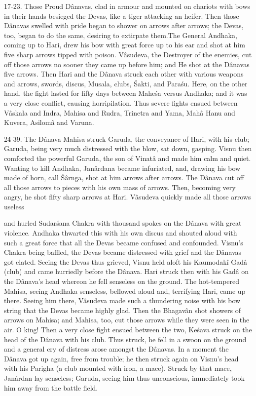 17-23. Those Proud D\^anavas, clad in armour and mounted on chariots with bows in their hands besieged the Devas, like a tiger attacking an heifer. Then those D\^anavas swelled with pride began to shower on arrows after arrows; the Devas, too, began to do the same, desiring to extirpate them.The General Andhaka, coming up to Hari, drew his bow with great force up to his ear and shot at him five sharp arrows tipped with poison. V\^asudeva, the Destroyer of the enemies, cut off those arrows no sooner they came up before him; and He shot at the D\^anavas five arrows. Then Hari and the D\^anava struck each other with various weapons and arrows, swords, discus, Musala, clubs, \'Sakti, and Para\'su. Here, on the other hand, the fight lasted for fifty days between Mahe\'sa versus Andhaka; and it was a very close conflict, causing horripilation. Thus severe fights ensued between V\^askala and Indra, Mahisa and Rudra, Trinetra and Yama, Mah\^a Hanu and Kuvera, Asilom\^a and Varuna.

24-39. The D\^anava Mahisa struck Garuda, the conveyance of Hari, with his club; Garuda, being very much distressed with the blow, sat down, gasping. Visnu then comforted the powerful Garuda, the son of Vinat\^a and made him calm and quiet. Wanting to kill Andhaka, Jan\^ardana became infuriated, and, drawing his bow made of horn, call \'S\^arnga, shot at him arrows after arrows. The D\^anava cut off all those arrows to pieces with his own mass of arrows. Then, becoming very angry, he shot fifty sharp arrows at Hari. V\^asudeva quickly made all those arrows useless

and hurled Sudar\'sana Chakra with thousand spokes on the D\^anava with great violence. Andhaka thwarted this with his own discus and shouted aloud with such a great force that all the Devas became confused and confounded. Visnu's Chakra being baffled, the Devas became distressed with grief and the D\^anavas got elated. Seeing the Devas thus grieved, Visnu held aloft his Kaumodak\^i Gad\^a (club) and came hurriedly before the D\^anava. Hari struck then with his Gad\^a on the D\^anava's head whereon he fell senseless on the ground. The hot-tempered Mahisa, seeing Andhaka senseless, bellowed aloud and, terrifying Hari, came up there. Seeing him there, V\^asudeva made such a thundering noise with his bow string that the Devas became highly glad. Then the Bhagav\^an shot showers of arrows on Mahisa; and Mahisa, too, cut those arrows while they were seen in the air. O king! Then a very close fight ensued between the two, Ke\'sava struck on the head of the D\^anava with his club. Thus struck, he fell in a swoon on the ground and a general cry of distress arose amongst the D\^anavas. In a moment the D\^anava got up again, free from trouble; he then struck again on Visnu's head with his Parigha (a club mounted with iron, a mace). Struck by that mace, Jan\^ardan lay senseless; Garuda, seeing him thus unconscious, immediately took him away from the battle field.

